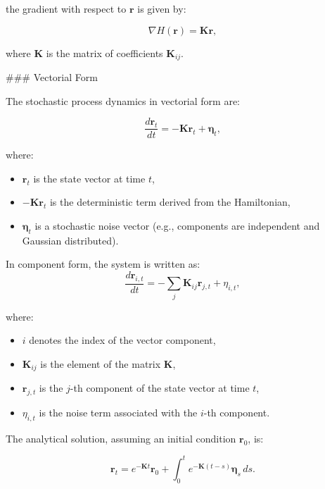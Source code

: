 \documentclass[English, Lau, oneside]{sapthesis}
\begin{document}
\begin{itemize}
the gradient with respect to \(\mathbf{r}\) is given by:

\begin{equation}
\nabla H(\mathbf{r}) = \mathbf{K} \mathbf{r},
\end{equation}

where \(\mathbf{K}\) is the matrix of coefficients \(\mathbf{K}_{ij}\).

### Vectorial Form

The stochastic process dynamics in vectorial form are:

\begin{equation}
\frac{d\mathbf{r}_t}{dt} = -\mathbf{K} \mathbf{r}_t + \boldsymbol{\eta}_t,
\end{equation}

where:
\begin{itemize}
    \item \(\mathbf{r}_t\) is the state vector at time \(t\),
    \item \(-\mathbf{K} \mathbf{r}_t\) is the deterministic term derived from the Hamiltonian,
    \item \(\boldsymbol{\eta}_t\) is a stochastic noise vector (e.g., components are independent and Gaussian distributed).
\end{itemize}
In component form, the system is written as:
\begin{equation}
\frac{d\mathbf{r}_{i,t}}{dt} = -\sum_{j} \mathbf{K}_{ij} \mathbf{r}_{j,t} + \eta_{i,t},
\end{equation}

where:
\begin{itemize}
    \item \(i\) denotes the index of the vector component,
    \item \(\mathbf{K}_{ij}\) is the element of the matrix \(\mathbf{K}\),
    \item \(\mathbf{r}_{j,t}\) is the \(j\)-th component of the state vector at time \(t\),
    \item \(\eta_{i,t}\) is the noise term associated with the \(i\)-th component.
\end{itemize}

The analytical solution, assuming an initial condition \(\mathbf{r}_0\), is:

\begin{equation}
\mathbf{r}_t = e^{-\mathbf{K} t} \mathbf{r}_0 + \int_0^t e^{-\mathbf{K} (t-s)} \boldsymbol{\eta}_s \, ds.
\end{equation}


\end{itemize}
\end{document}

